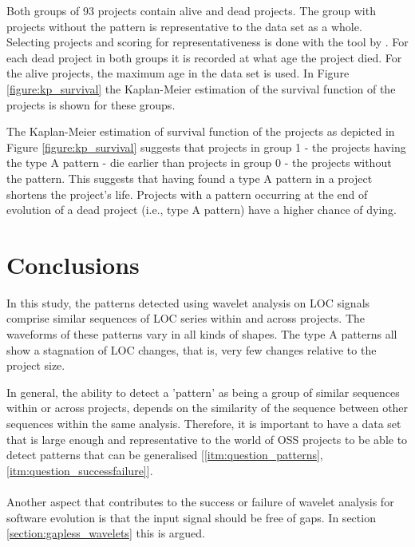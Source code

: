 Both groups of 93 projects contain alive and dead projects. The group with
projects without the pattern is representative to the data set as a whole.
Selecting projects and scoring for representativeness is done with the tool by
\citet{nagappan}. For each dead project in both groups it is recorded at what
age the project died. For the alive projects, the maximum age in the
data set is used. In Figure \ref{figure:kp_survival} the Kaplan-Meier
estimation of the survival function of the projects is shown for these groups.



\noindent
The Kaplan-Meier estimation of survival function of the projects as depicted in
Figure \ref{figure:kp_survival} suggests that projects in group 1 - the
projects having the type A pattern - die earlier than projects in group 0 - the
projects without the pattern. This suggests that having found a type A pattern
in a project shortens the project's life. Projects with a pattern occurring at
the end of evolution of a dead project (i.e., type A pattern) have a higher
chance of dying.

\section{Conclusions}
\label{section:conclusions}
In this study, the patterns detected using wavelet analysis on LOC signals
comprise similar sequences of LOC series within and across projects. The
waveforms of these patterns vary in all kinds of shapes. The type A patterns
all show a stagnation of LOC changes, that is, very few changes relative to the
project size.

In general, the ability to detect a 'pattern' as being a group of similar
sequences within or across projects, depends on the similarity of the sequence
between other sequences within the same analysis. Therefore, it is important to
have a data set that is large enough and representative to the world of OSS
projects to be able to detect patterns that can be generalised
[\ref{itm:question_patterns}, \ref{itm:question_successfailure}].

\paragraph{}
Another aspect that contributes to the success or failure of wavelet analysis
for software evolution is that the input signal should be free of gaps. In
section \ref{section:gapless_wavelets} this is argued.

